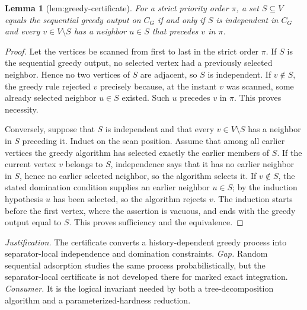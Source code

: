 \documentclass{article}
\newtheorem{lemma}{Lemma}
\begin{document}
\begin{lemma}[lem:greedy-certificate]\label{lem:greedy-certificate}
For a strict priority order \(\pi\), a set \(S\subseteq V\) equals the sequential greedy output on \(C_G\) if and only if \(S\) is independent in \(C_G\) and every \(v\in V\setminus S\) has a neighbor \(u\in S\) that precedes \(v\) in \(\pi\).
\end{lemma}
\begin{proof}
Let the vertices be scanned from first to last in the strict order \(\pi\).  If \(S\) is the sequential greedy output, no selected vertex had a previously selected neighbor.  Hence no two vertices of \(S\) are adjacent, so \(S\) is independent.  If \(v\notin S\), the greedy rule rejected \(v\) precisely because, at the instant \(v\) was scanned, some already selected neighbor \(u\in S\) existed.  Such \(u\) precedes \(v\) in \(\pi\).  This proves necessity.

Conversely, suppose that \(S\) is independent and that every \(v\in V\setminus S\) has a neighbor in \(S\) preceding it.  Induct on the scan position.  Assume that among all earlier vertices the greedy algorithm has selected exactly the earlier members of \(S\).  If the current vertex \(v\) belongs to \(S\), independence says that it has no earlier neighbor in \(S\), hence no earlier selected neighbor, so the algorithm selects it.  If \(v\notin S\), the stated domination condition supplies an earlier neighbor \(u\in S\); by the induction hypothesis \(u\) has been selected, so the algorithm rejects \(v\).  The induction starts before the first vertex, where the assertion is vacuous, and ends with the greedy output equal to \(S\).  This proves sufficiency and the equivalence.
\end{proof}
\par\smallskip\noindent \textit{Justification.} The certificate converts a history-dependent greedy process into separator-local independence and domination constraints. \textit{Gap.} Random sequential adsorption studies the same process probabilistically, but the separator-local certificate is not developed there for marked exact integration. \textit{Consumer.} It is the logical invariant needed by both a tree-decomposition algorithm and a parameterized-hardness reduction.
\end{document}
